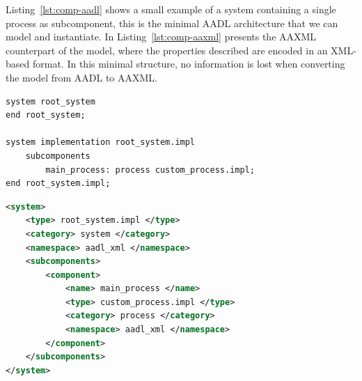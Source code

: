 Listing~\ref{lst:comp-aadl} shows a small example of a system containing a single process as subcomponent, this is the minimal AADL architecture that we can model and instantiate. In Listing~\ref{lst:comp-aaxml} presents the AAXML counterpart of the model, where the properties described are encoded in an XML-based format. In this minimal structure, no information is lost when converting the model from AADL to AAXML.

\begin{lstlisting}[language=AADL,caption={TODO caption},label=lst:comp-aadl]
system root_system
end root_system;

system implementation root_system.impl
	subcomponents
		main_process: process custom_process.impl;
end root_system.impl;
\end{lstlisting}

\begin{lstlisting}[language=XML,caption={TODO caption},label=lst:comp-aaxml]
<system>
	<type> root_system.impl </type>
	<category> system </category>
	<namespace> aadl_xml </namespace>
	<subcomponents>
		<component>
			<name> main_process </name>
			<type> custom_process.impl </type>
			<category> process </category>
			<namespace> aadl_xml </namespace>
		</component>
	</subcomponents>
</system>
\end{lstlisting}

